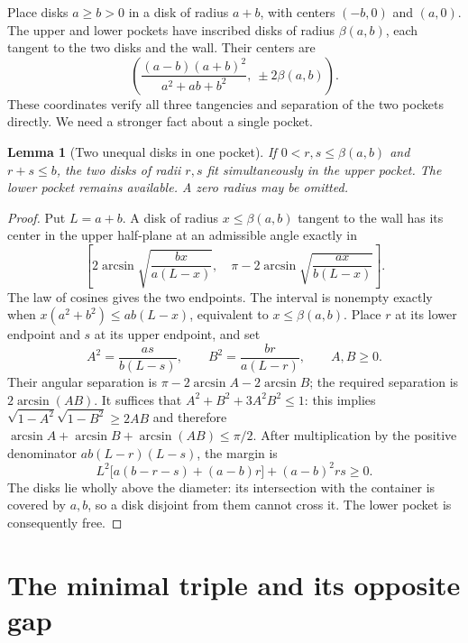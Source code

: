 \documentclass[11pt]{article}
\newtheorem{lemma}[theorem]{Lemma}
\theoremstyle{remark}
\newcommand{\bp}{\beta}
\begin{document}
Place disks $a\ge b>0$ in a disk of radius $a+b$, with centers
$(-b,0)$ and $(a,0)$. The upper and lower pockets have inscribed
disks of radius $\bp(a,b)$, each tangent to the two disks and the wall.
Their centers are
\[
 \left(\frac{(a-b)(a+b)^2}{a^2+ab+b^2},\ \pm2\bp(a,b)\right).
\]
These coordinates verify all three tangencies and separation of the two
pockets directly. We need a stronger fact about a single pocket.

\begin{lemma}[Two unequal disks in one pocket]\label{lem:arbelos}
If $0<r,s\le\bp(a,b)$ and $r+s\le b$, the two disks of radii
$r,s$ fit simultaneously in the upper pocket. The lower pocket remains
available. A zero radius may be omitted.
\end{lemma}
\begin{proof}
Put $L=a+b$. A disk of radius $x\le\bp(a,b)$ tangent to the wall
has its center in the upper half-plane at an admissible angle exactly in
\[
 \left[2\arcsin\sqrt{\frac{bx}{a(L-x)}},\quad
 \pi-2\arcsin\sqrt{\frac{ax}{b(L-x)}}\right].
\]
The law of cosines gives the two endpoints. The interval is nonempty
exactly when $x(a^2+b^2)\le ab(L-x)$, equivalent to $x\le\bp(a,b)$.
Place $r$ at its lower endpoint and $s$ at its upper endpoint, and set
\[
 A^2=\frac{as}{b(L-s)},\qquad B^2=\frac{br}{a(L-r)},\qquad A,B\ge0.
\]
Their angular separation is $\pi-2\arcsin A-2\arcsin B$; the
required separation is $2\arcsin(AB)$. It suffices that
$A^2+B^2+3A^2B^2\le1$: this implies
$\sqrt{1-A^2}\sqrt{1-B^2}\ge2AB$ and therefore
$\arcsin A+\arcsin B+\arcsin(AB)\le\pi/2$.
After multiplication by the positive denominator $ab(L-r)(L-s)$,
the margin is
\[
 L^2\bigl[a(b-r-s)+(a-b)r\bigr]+(a-b)^2rs\ge0.
\]
The disks lie wholly above the diameter: its intersection with the
container is covered by $a,b$, so a disk disjoint from them cannot
cross it. The lower pocket is consequently free.
\end{proof}

\section{The minimal triple and its opposite gap}
\end{document}

